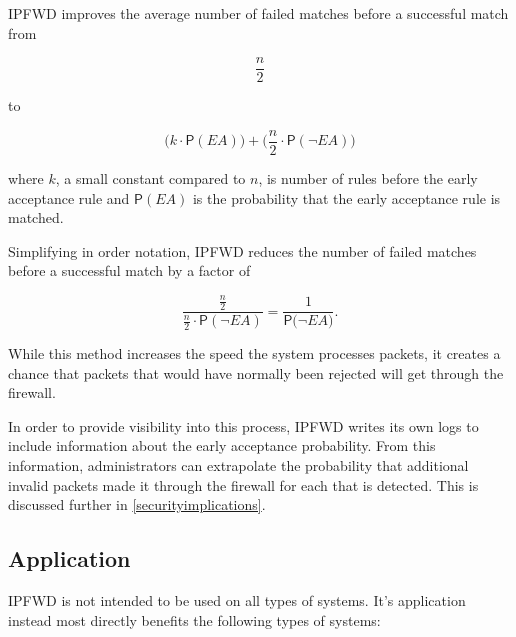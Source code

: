 \documentclass[journal]{IEEEtran}
\begin{document}
  IPFWD improves the average number of failed matches before a successful match
  from

  \[
  \frac{n}{2}
  \]

  to

  \[
  \Big(k \cdot \mathsf{P}(\textit{EA})\Big) + 
  \Big(\frac{n}{2} \cdot \mathsf{P}(\neg{\textit{EA}})\Big) 
  \]

  where $k$, a small constant compared to $n$, is number of rules before the
  early acceptance rule and $\mathsf{P}(\textit{EA})$ is the probability that
  the early acceptance rule is matched.

  Simplifying in order notation, IPFWD reduces the number of failed matches before
  a successful match by a factor of

  \[
  \frac
      {\frac{n}{2}}
      {\frac{n}{2} \cdot \mathsf{P}(\neg{\textit{EA}})} 
  = \frac{1}{\mathsf{P}(\neg{\textit{EA})}}.
  \]

  While this method increases the speed the system processes packets, it
  creates a chance that packets that would have normally been rejected will get
  through the firewall.

  In order to provide visibility into this process, IPFWD writes its own logs
  to include information about the early acceptance probability. From this
  information, administrators can extrapolate the probability that additional
  invalid packets made it through the firewall for each that is detected. This
  is discussed further in \ref{securityimplications}.

  \subsection{Application}

    IPFWD is not intended to be used on all types of systems. It's application
    instead most directly benefits the following types of systems:
\end{document}
